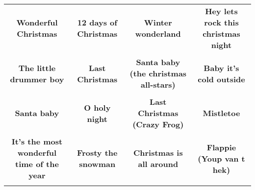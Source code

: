 \documentclass[12pt]{article} \usepackage{eso-pic, graphicx}
\newcommand{\background}[1]{%
\AddToShipoutPictureBG*{\texttt{[image: \#1]}}
}
\begin{document}
\tabcolsep=30.2pt \renewcommand{\arraystretch}{4.5}   \vspace*{4.3cm} \begin{center}  \begin{tabular}{c c c c}
\parbox{3cm}{\centering \textbf{Wonderful Christmas}}& 
\parbox{3cm}{\centering \textbf{12 days of Christmas}}& 
\parbox{3cm}{\centering \textbf{Winter wonderland}}& 
\parbox{3cm}{\centering \textbf{Hey lets rock this christmas night}}\\ \\ 
\parbox{3cm}{\centering \textbf{The little drummer boy}}& 
\parbox{3cm}{\centering \textbf{Last Christmas}}& 
\parbox{3cm}{\centering \textbf{Santa baby (the christmas all-stars)}}& 
\parbox{3cm}{\centering \textbf{Baby it’s cold outside}}\\ \\ 
\parbox{3cm}{\centering \textbf{Santa baby}}& 
\parbox{3cm}{\centering \textbf{O holy night}}& 
\parbox{3cm}{\centering \textbf{Last Christmas (Crazy Frog)}}& 
\parbox{3cm}{\centering \textbf{Mistletoe}}\\ \\ 
\parbox{3cm}{\centering \textbf{It’s the most wonderful time of the year}}& 
\parbox{3cm}{\centering \textbf{Frosty the snowman}}& 
\parbox{3cm}{\centering \textbf{Christmas is all around}}& 
\parbox{3cm}{\centering \textbf{Flappie (Youp van t hek)}}\\ \\ 
\end{tabular} \background{discobingo.pdf} \end{center} 
\end{document}
